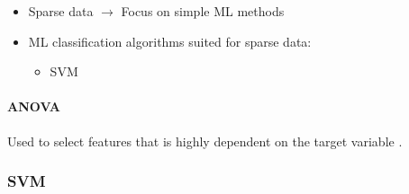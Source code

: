 \begin{itemize}
    \item Sparse data $ \rightarrow $ Focus on simple ML methods
    \item ML classification algorithms suited for sparse data: 
        \begin{itemize}
            \item SVM
        \end{itemize}
        
\end{itemize}



\paragraph{ANOVA} 
Used to select features that is highly dependent on the target variable
\cite{anova}. 











\subsubsection{SVM}








